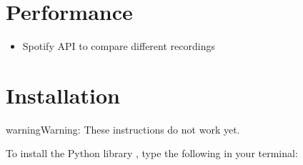 \documentclass[letterpaper,10pt,english]{sphinxmanual}
\begin{document}
\section{Performance}
\label{\detokenize{6_advanced:performance}}\begin{itemize}
\item {} 
Spotify API to compare different recordings

\end{itemize}

\cleardoublepage
\begingroup
\renewcommand\chapter[1]{\endgroup}


\chapter{Bibliography}
\label{\detokenize{8_bibliography:bibliography}}\label{\detokenize{8_bibliography::doc}}



\chapter{Developers}
\label{\detokenize{index:developers}}

\section{Installation}
\label{\detokenize{install:installation}}\label{\detokenize{install::doc}}
\begin{sphinxadmonition}{warning}{Warning:}
These instructions do not work yet.
\end{sphinxadmonition}

To install the Python library , type the following in your terminal:

\begin{sphinxVerbatim}[commandchars=\\\{\}]
  
\end{sphinxVerbatim}
\end{document}

